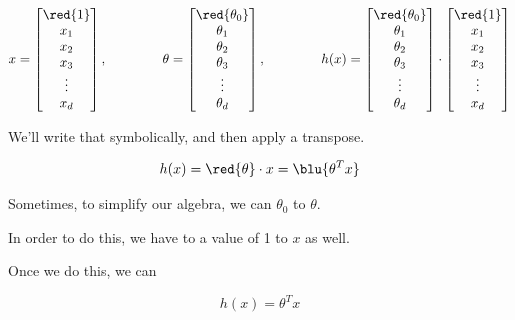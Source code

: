         \begin{equation}
            x = 
            \begin{bmatrix}
              \red{1} \\ x_1 \\ x_2 \\ x_3 \\ \vdots \\ x_d
            \end{bmatrix},
            \;\;\;\;\;\;\;\;\;\;\;\;\;\;\;
            \theta = 
            \begin{bmatrix}
              \red{\theta_0} \\ \theta_1 \\ \theta_2 \\ \theta_3 \\ \vdots \\ \theta_d
            \end{bmatrix},
            \;\;\;\;\;\;\;\;\;\;\;\;\;\;\;
            h(x) = 
            \begin{bmatrix}
              \red{\theta_0} \\ \theta_1 \\ \theta_2 \\ \theta_3 \\ \vdots \\ \theta_d
            \end{bmatrix}
            \cdot
            \begin{bmatrix}
              \red{1} \\ x_1 \\ x_2 \\ x_3 \\ \vdots \\ x_d
            \end{bmatrix}
        \end{equation}

        We'll write that symbolically, and then apply a transpose.
        
        \begin{equation}
            h(x) = \red{\theta} \cdot x = \blu{ \theta^T x }
        \end{equation}
        
        \begin{concept}
            Sometimes, to simplify our algebra, we can  $\theta_0$ to $\theta$. 
            
            In order to do this, we have to  a value of 1 to $x$ as well.
            
            Once we do this, we can  
            
            \begin{equation*}
                h(x)=\theta^T x
            \end{equation*}
        \end{concept}
        
